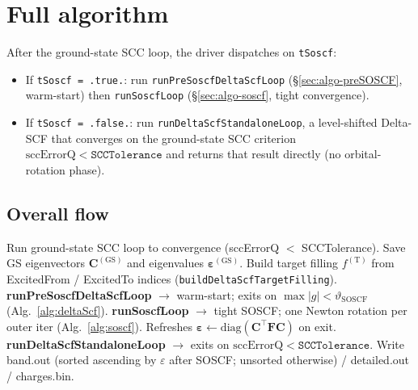 \documentclass[11pt,a4paper]{article}
\newcommand{\FF}{\mathbf{F}}
\newcommand{\CC}{\mathbf{C}}
\begin{document}
\section{Full algorithm}\label{sec:algorithm}

After the ground-state SCC loop, the driver dispatches on \texttt{tSoscf}:
\begin{itemize}[leftmargin=*,nosep]
\item If \texttt{tSoscf = .true.}: run \texttt{runPreSoscfDeltaScfLoop}
  (\S\ref{sec:algo-preSOSCF}, warm-start) then
  \texttt{runSoscfLoop} (\S\ref{sec:algo-soscf}, tight convergence).
\item If \texttt{tSoscf = .false.}: run \texttt{runDeltaScfStandaloneLoop},
  a level-shifted Delta-SCF that converges on the ground-state SCC
  criterion $\mathrm{sccErrorQ}<\mathtt{SCCTolerance}$ and returns that
  result directly (no orbital-rotation phase).
\end{itemize}

\subsection{Overall flow}

\begin{algorithm}[H]
\caption{DFTB+ excited-state Delta-SCF / SOSCF driver (see \texttt{main.F90:1371}).}
\label{alg:overall}
\begin{algorithmic}[1]
\State Run ground-state SCC loop to convergence (sccErrorQ $<$ SCCTolerance).
\State Save GS eigenvectors $\CC^{(\mathrm{GS})}$ and eigenvalues $\bm{\varepsilon}^{(\mathrm{GS})}$.
\State Build target filling $f^{(\mathrm{T})}$ from ExcitedFrom / ExcitedTo indices (\texttt{buildDeltaScfTargetFilling}).
    \State \textbf{runPreSoscfDeltaScfLoop} $\to$ warm-start; exits on $\max|g|<\vartheta_\mathrm{SOSCF}$ (Alg.~\ref{alg:deltaScf}).
    \State \textbf{runSoscfLoop} $\to$ tight SOSCF; one Newton rotation per outer iter (Alg.~\ref{alg:soscf}). Refreshes $\bm{\varepsilon}\leftarrow\mathrm{diag}(\CC^{\top}\FF\CC)$ on exit.
  \Else
    \State \textbf{runDeltaScfStandaloneLoop} $\to$ exits on $\mathrm{sccErrorQ}<\mathtt{SCCTolerance}$.
  \EndIf
\EndIf
\State Write band.out (sorted ascending by $\varepsilon$ after SOSCF; unsorted otherwise) / detailed.out / charges.bin.
\end{algorithmic}
\end{algorithm}
\end{document}
